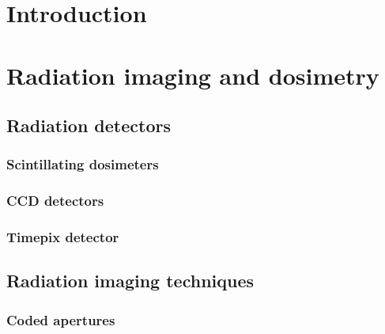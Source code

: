 \documentclass[a4paper,12pt,titlepage, twoside]{article}
\begin{document}
\pagestyle{fancy}
\cfoot{\thepage}
\tableofcontents
{}
\cleardoublepage



\section{Introduction}



\section{Radiation imaging and dosimetry}


\subsection{Radiation detectors}


\subsubsection{Scintillating dosimeters}



\subsubsection{CCD detectors}



\subsubsection{Timepix detector}




\subsection{Radiation imaging techniques}


\subsubsection{Coded apertures}
\end{document}
